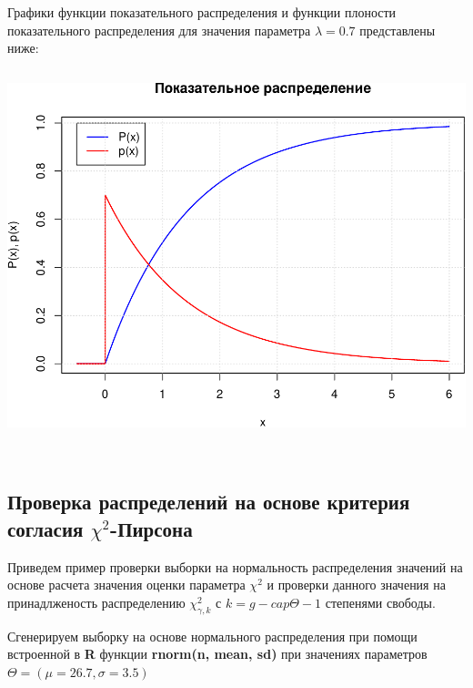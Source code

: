 \documentclass[
  14,
]{article}
\begin{document}
Графики функции показательного распределения и функции плоности
показательного распределения для значения параметра \(\lambda = 0.7\)
представлены ниже:

\[
\ 
\]

\begin{center}\includegraphics[width=0.75\linewidth]{Prac3_files/figure-latex/unnamed-chunk-4-1} \end{center}

\(\ \)

\hypertarget{ux43fux440ux43eux432ux435ux440ux43aux430-ux440ux430ux441ux43fux440ux435ux434ux435ux43bux435ux43dux438ux439-ux43dux430-ux43eux441ux43dux43eux432ux435-ux43aux440ux438ux442ux435ux440ux438ux44f-ux441ux43eux433ux43bux430ux441ux438ux44f-chi2-ux43fux438ux440ux441ux43eux43dux430}{%
\subsection{\texorpdfstring{\textbf{Проверка распределений на основе
критерия согласия
\(\chi^2\)-Пирсона}}{Проверка распределений на основе критерия согласия \textbackslash chi\^{}2-Пирсона}}\label{ux43fux440ux43eux432ux435ux440ux43aux430-ux440ux430ux441ux43fux440ux435ux434ux435ux43bux435ux43dux438ux439-ux43dux430-ux43eux441ux43dux43eux432ux435-ux43aux440ux438ux442ux435ux440ux438ux44f-ux441ux43eux433ux43bux430ux441ux438ux44f-chi2-ux43fux438ux440ux441ux43eux43dux430}}

Приведем пример проверки выборки на нормальность распределения значений
на основе расчета значения оценки параметра \(\chi^2\) и проверки
данного значения на принадлженость распределению \(\chi_{\gamma, k}^2\)
с \(k = g - cap\Theta - 1\) степенями свободы.

Сгенерируем выборку на основе нормального распределения при помощи
встроенной в \textbf{R} функции \textbf{rnorm(n, mean, sd)} при
значениях параметров \(\Theta = (\mu = 26.7, \sigma = 3.5)\)
\end{document}
